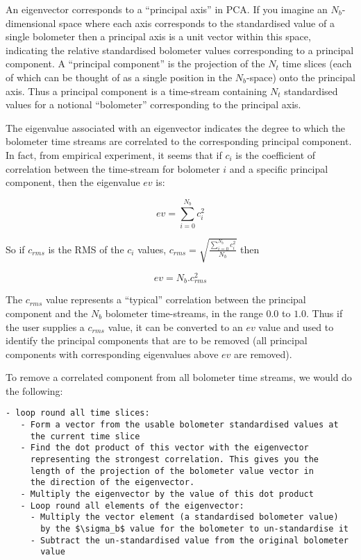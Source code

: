 \documentclass{article}
\begin{document}
\begin{equation*}
[ V_0^0, V_1^0, V_2^0, V_0^1, V_1^1, V_2^1, V_0^2, V_1^2, V_2^2 ]
\end{equation*}

An eigenvector corresponds to a ``principal axis'' in PCA. If you imagine
an $N_b$-dimensional space where each axis corresponds to the standardised
value of a single bolometer then a principal axis is a unit vector within this space,
indicating the relative standardised bolometer values corresponding to a principal
component. A ``principal component'' is the projection of the $N_t$ time slices
(each of which can be thought of as a single position in the $N_b$-space) onto the
principal axis. Thus a principal component is a time-stream containing $N_t$
standardised values for a notional ``bolometer'' corresponding to the principal axis.

The eigenvalue associated with an eigenvector indicates the degree to
which the bolometer time streams are correlated to the corresponding
principal component. In fact, from empirical experiment, it seems that if
$c_i$ is the coefficient of correlation between the time-stream for bolometer
$i$ and a specific principal component, then the eigenvalue $ev$ is:

\begin{equation*}
ev = \sum_{i=0}^{N_b}c_i^2
\end{equation*}

So if $c_{rms}$ is the RMS of the $c_i$ values,
$c_{rms} = \sqrt{\frac{\sum_{i=0}^{N_b}c_i^2}{N_b}}$ then

\begin{equation*}
ev = N_b.c_{rms}^2
\end{equation*}

The $c_{rms}$ value represents a ``typical'' correlation between the
principal component and the $N_b$ bolometer time-streams, in the range
$0.0$ to $1.0$. Thus if the user supplies a $c_{rms}$ value, it can be
converted to an $ev$ value and used to identify the principal components
that are to be removed (all principal components with corresponding
eigenvalues above $ev$ are removed).

To remove a correlated component from all bolometer time streams, we
would do the following:

\begin{verbatim}
- loop round all time slices:
   - Form a vector from the usable bolometer standardised values at
     the current time slice
   - Find the dot product of this vector with the eigenvector
     representing the strongest correlation. This gives you the
     length of the projection of the bolometer value vector in
     the direction of the eigenvector.
   - Multiply the eigenvector by the value of this dot product
   - Loop round all elements of the eigenvector:
     - Multiply the vector element (a standardised bolometer value)
       by the $\sigma_b$ value for the bolometer to un-standardise it
     - Subtract the un-standardised value from the original bolometer
       value
\end{verbatim}
\end{document}
